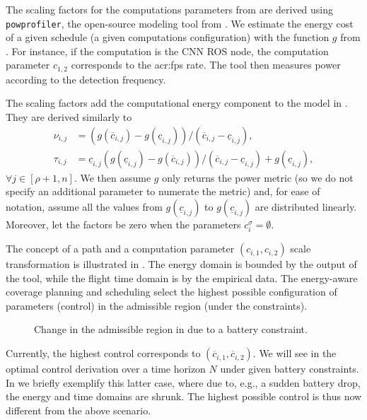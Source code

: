 The scaling factors for the computations parameters from  are derived using {\small\tt{powprofiler}}, the open-source modeling tool from . We estimate the energy cost of a given schedule (a given computations configuration) with the function $g$ from . 
For instance, if the computation is the CNN ROS node, the computation parameter $c_{1,2}$ corresponds to the \Gls{acr:fps} rate. The tool then measures power according to the detection frequency.

The scaling factors add the computational energy component to the model in . They are derived similarly to 
\begin{subequations}\label{eq:scale-comp}\begin{align}
  \nu_{i,j}&=(g(\overline{c}_{i,j})-g(\underline{c}_{i,j}))/(\overline{c}_{i,j}-\underline{c}_{i,j}),\\
  \tau_{i,j}&=\underline{c}_{i,j}(g(\underline{c}_{i,j})-g(\overline{c}_{i,j}))/(\overline{c}_{i,j}-\underline{c}_{i,j})+g(\underline{c}_{i,j}),
\end{align}\end{subequations}
$\forall j\in[\rho+1,n]$. We then assume $g$ only returns the power metric (so we do not specify an additional parameter to numerate the metric) and, for ease of notation, assume all the values from $g(\underline{c}_{i,j})$ to $g(\underline{c}_{i,j})$ are distributed linearly. Moreover, let the factors be zero when the parameters $c_i^\sigma=\emptyset$.

The concept of a path and a computation parameter $(c_{i,1},c_{i,2})$ scale transformation is illustrated in . 
The energy domain is bounded by the output of the \powprof{} tool, while the flight time domain is by the empirical data. The energy-aware coverage planning and scheduling select the highest possible configuration of parameters (control) in the admissible region (under the constraints). 
\begin{figure}[h!]
  \centering
  \selectfont
  
  \caption[Change in the admissible region]{Change in the admissible region in  due to a battery constraint.}
  \label{fig:plot-7}
\end{figure}
Currently, the highest control corresponds to $(\overline{c}_{i,1},\overline{c}_{i,2})$. We will see in  the optimal control derivation over a time horizon $N$ under given battery constraints.
In  we briefly exemplify this latter case, where due to, e.g., a sudden battery drop, the energy and time domains are shrunk. The highest possible control is thus now different from the above scenario.

